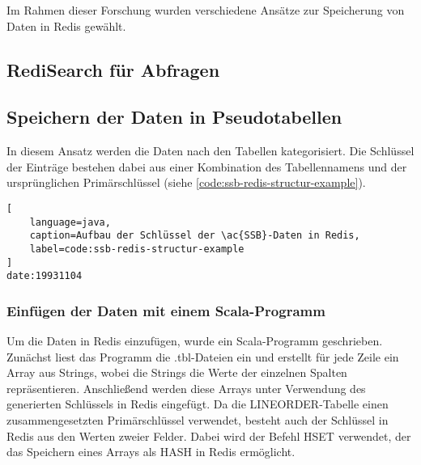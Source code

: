 Im Rahmen dieser Forschung wurden verschiedene Ansätze zur Speicherung von Daten in Redis gewählt.
\subsection{RediSearch für Abfragen}


\subsection{Speichern der Daten in Pseudotabellen}
In diesem Ansatz werden die Daten nach den Tabellen kategorisiert.
Die Schlüssel der Einträge bestehen dabei aus einer Kombination des Tabellennamens und der ursprünglichen Primärschlüssel (siehe \cref{code:ssb-redis-structur-example}).

\begin{lstlisting}[
    language=java,
    caption=Aufbau der Schlüssel der \ac{SSB}-Daten in Redis,
    label=code:ssb-redis-structur-example
]
date:19931104
\end{lstlisting}

\subsubsection{Einfügen der Daten mit einem Scala-Programm}
Um die Daten in Redis einzufügen, wurde ein Scala-Programm geschrieben.
Zunächst liest das Programm die .tbl-Dateien ein und erstellt für jede Zeile ein Array aus Strings, wobei die Strings die Werte der einzelnen Spalten repräsentieren.
Anschließend werden diese Arrays unter Verwendung des generierten Schlüssels in Redis eingefügt.
Da die LINEORDER-Tabelle einen zusammengesetzten Primärschlüssel verwendet, besteht auch der Schlüssel in Redis aus den Werten zweier Felder.
Dabei wird der Befehl HSET verwendet, der das Speichern eines Arrays als HASH in Redis ermöglicht.

